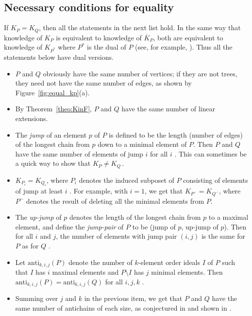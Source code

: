 \documentclass[ALCO,Unicode,published]{cedram}
\newcommand{\anti}{\mathrm{anti}}
\newcommand{\KK}[1]{\overline{K}_{#1}}
\begin{document}
\subsection{Necessary conditions for equality}

If $K_P = K_Q$, then all the statements in the next list hold. In the same way that knowledge of $K_P$ is equivalent to knowledge of $\KK{P}$, both are equivalent to knowledge of $K_{P^*}$ where $P^*$ is the dual of $P$ (see, for example, \cite[\S 3]{McWa14}).  Thus all the statements below have dual versions.

\begin{itemize}
\item $P$ and $Q$ obviously have the same number of vertices; if they are not trees, they need not have the same number of edges, as shown by Figure~\ref{fig:equal_kp}(a).
\item By Theorem~\ref{theo:KinF}, $P$ and $Q$ have the same number of linear extensions.
\item The \emph{jump} of an element $p$ of $P$ is defined to be the length (number of edges) of the longest chain from $p$ down to a minimal element of $P$.  Then $P$ and $Q$ have the same number of elements of jump $i$ for all $i$  \cite{McWa14}.  This can sometimes be a quick way to show that $K_P \neq K_Q$\,.

\item $K_{P_i} = K_{Q_i}$, where $P_i$ denotes the induced subposet of $P$ consisting of elements of jump at least $i$ \cite{McWa14}.  For example, with $i=1$, we get that $K_{P^-} = K_{Q^-}$, where $P^-$ denotes the result of deleting all the minimal elements from $P$.

\item The \emph{up-jump} of $p$ denotes the length of the longest chain from $p$ to a maximal element, and define the \emph{jump-pair} of $P$ to be (jump of $p$, up-jump of $p$).  Then for all $i$ and $j$, the number of elements with jump pair $(i,j)$ is the same for $P$ as for $Q$ \cite{LiWe20}.

\item Let $\anti_{k,i,j}(P)$ denote the number of $k$-element order ideals $I$ of $P$ such that $I$ has $i$ maximal elements and $P\setminus I$ has $j$ minimal elements.  Then $\anti_{k,i,j}(P) = \anti_{k,i,j}(Q)$ for all $i,j,k$ \cite{LiWe20}.

\item Summing over $j$ and $k$ in the previous item, we get that $P$ and $Q$ have the same number of antichains of each size, as conjectured in \cite{McWa14} and shown in \cite{LiWe20}.


\end{itemize}
\end{document}

